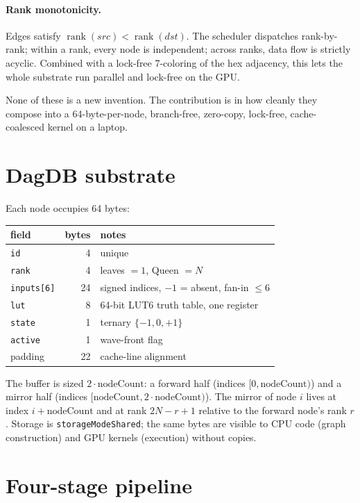 \documentclass[11pt]{article}
\newcommand{\rank}{\operatorname{rank}}
\begin{document}
\paragraph{Rank monotonicity.} Edges satisfy
$\rank(src) < \rank(dst)$. The scheduler dispatches rank-by-rank;
within a rank, every node is independent; across ranks, data flow is
strictly acyclic. Combined with a lock-free 7-coloring of the hex
adjacency, this lets the whole substrate run parallel and lock-free
on the GPU.

None of these is a new invention. The contribution is in how cleanly
they compose into a 64-byte-per-node, branch-free, zero-copy,
lock-free, cache-coalesced kernel on a laptop.

\section{DagDB substrate}
\label{sec:dagdb}

Each node occupies 64 bytes:

\begin{center}
\begin{tabular}{lr l}
\toprule
field & bytes & notes \\
\midrule
\texttt{id} & 4 & unique \\
\texttt{rank} & 4 & leaves $=1$, Queen $=N$ \\
\texttt{inputs[6]} & 24 & signed indices, $-1$ = absent, fan-in $\leq 6$ \\
\texttt{lut} & 8 & 64-bit LUT6 truth table, one register \\
\texttt{state} & 1 & ternary $\{-1,0,+1\}$ \\
\texttt{active} & 1 & wave-front flag \\
padding & 22 & cache-line alignment \\
\bottomrule
\end{tabular}
\end{center}

The buffer is sized $2 \cdot \text{nodeCount}$: a forward half
(indices $[0, \text{nodeCount})$) and a mirror half (indices
$[\text{nodeCount}, 2\cdot\text{nodeCount})$). The mirror of node $i$
lives at index $i + \text{nodeCount}$ and at rank $2N - r + 1$
relative to the forward node's rank $r$. Storage is
\texttt{storageModeShared}; the same bytes are visible to CPU code
(graph construction) and GPU kernels (execution) without copies.

\section{Four-stage pipeline}
\label{sec:pipeline}
\end{document}
